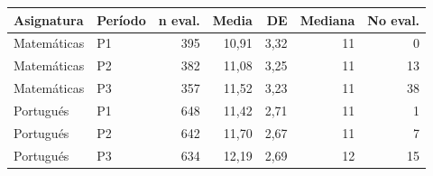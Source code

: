 \begin{tabular}{llrrrrr}
\toprule
Asignatura & Período & n eval. & Media & DE & Mediana & No eval. \\
\midrule
Matemáticas & P1 & 395 & 10,91 & 3,32 & 11 & 0 \\
Matemáticas & P2 & 382 & 11,08 & 3,25 & 11 & 13 \\
Matemáticas & P3 & 357 & 11,52 & 3,23 & 11 & 38 \\
Portugués & P1 & 648 & 11,42 & 2,71 & 11 & 1 \\
Portugués & P2 & 642 & 11,70 & 2,67 & 11 & 7 \\
Portugués & P3 & 634 & 12,19 & 2,69 & 12 & 15 \\
\bottomrule
\end{tabular}
